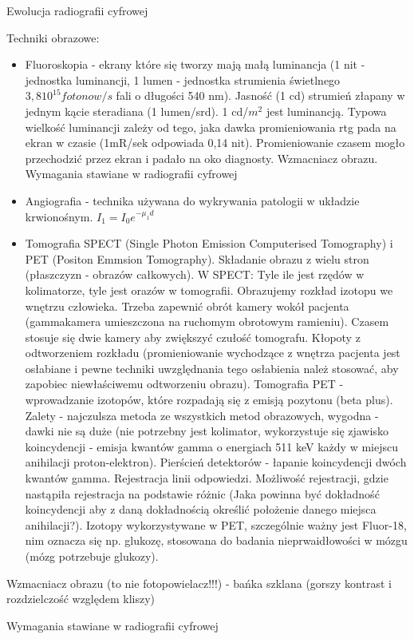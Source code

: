 \documentclass{article}
\begin{document}
Ewolucja radiografii cyfrowej

Techniki obrazowe:
\begin{itemize}
    \item Fluoroskopia - ekrany które się tworzy mają małą luminancja (1 nit - jednostka luminancji, 1 lumen - jednostka strumienia świetlnego $3,8 10^{15} fotonow/s$ fali o długości 540 nm). Jasność (1 cd) strumień złapany w jednym kącie steradiana (1 lumen\slash srd). 1 cd\slash $m^2$ jest luminancją. Typowa wielkość luminancji zależy od tego, jaka dawka promieniowania rtg pada na ekran w czasie (1mR/sek odpowiada 0,14 nit). Promieniowanie czasem mogło przechodzić przez ekran i padało na oko diagnosty. Wzmacniacz obrazu. Wymagania stawiane w radiografii cyfrowej
    \item Angiografia - technika używana do wykrywania patologii w układzie krwionośnym. $I_1 = I_0 e^{-\mu_1 d}$
    \item Tomografia SPECT (Single Photon Emission Computerised Tomography) i PET (Positon Emmsion Tomography). Składanie obrazu z wielu stron (płaszczyzn - obrazów całkowych). W SPECT: Tyle ile jest rzędów w kolimatorze, tyle jest orazów w tomografii. Obrazujemy rozkład izotopu we wnętrzu człowieka. Trzeba zapewnić obrót kamery wokół pacjenta (gammakamera umieszczona na ruchomym obrotowym ramieniu). Czasem stosuje się dwie kamery aby zwiększyć czułość tomografu. Kłopoty z odtworzeniem rozkładu (promieniowanie wychodzące z wnętrza pacjenta jest osłabiane i pewne techniki uwzględnania tego osłabienia należ stosować, aby zapobiec niewłaściwemu odtworzeniu obrazu). Tomografia PET - wprowadzanie izotopów, które rozpadają się z emisją pozytonu (beta plus). Zalety - najczulsza metoda ze wszystkich metod obrazowych, wygodna - dawki nie są duże (nie potrzebny jest kolimator, wykorzystuje się zjawisko koincydencji - emisja kwantów gamma o energiach 511 keV każdy w miejscu anihilacji proton-elektron). Pierścień detektorów - łapanie koincydencji dwóch kwantów gamma. Rejestracja linii odpowiedzi. Możliwość rejestracji, gdzie nastąpiła rejestracja na podstawie różnic (Jaka powinna być dokładność koincydencji aby z daną dokładnością określić położenie danego miejsca anihilacji?). Izotopy wykorzystywane w PET, szczególnie ważny jest Fluor-18, nim oznacza się np. glukozę, stosowana do badania nieprwaidłowości w mózgu (mózg potrzebuje glukozy).
\end{itemize}

Wzmacniacz obrazu (to nie fotopowielacz!!!) - bańka szklana (gorszy kontrast i rozdzielczość względem kliszy)

Wymagania stawiane w radiografii cyfrowej
\end{document}

